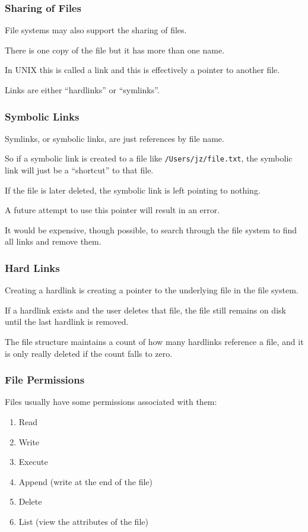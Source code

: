 \begin{frame}
\frametitle{Sharing of Files}

File systems may also support the sharing of files. 

There is one copy of the file but it has more than one name. 

In UNIX this is called a \alert{link} and this is effectively a pointer to another file. 

Links are either ``hardlinks'' or ``symlinks''.

\end{frame}

\begin{frame}
\frametitle{Symbolic Links}

Symlinks, or symbolic links, are just references by file name. 

So if a symbolic link is created to a file like \texttt{/Users/jz/file.txt}, the symbolic link will just be a ``shortcut'' to that file. 

If the file is later deleted, the symbolic link is left pointing to nothing. 

A future attempt to use this pointer will result in an error.

It would be expensive, though possible, to search through the file system to find all links and remove them.


\end{frame}

\begin{frame}
\frametitle{Hard Links}

Creating a hardlink is creating a pointer to the underlying file in the file system. 

If a hardlink exists and the user deletes that file, the file still remains on disk until the last hardlink is removed. 

The file structure maintains a count of how many hardlinks reference a file, and it is only really deleted if the count falls to zero.


\end{frame}



\begin{frame}
\frametitle{File Permissions}

Files usually have some permissions associated with them:

\begin{enumerate}
	\item Read
	\item Write
	\item Execute
	\item Append (write at the end of the file)
	\item Delete
	\item List (view the attributes of the file)
\end{enumerate} 

\end{frame}

